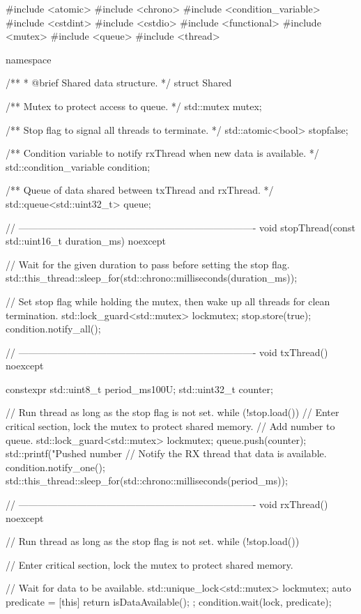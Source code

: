 \begin{cppcode}
#include <atomic>
#include <chrono>
#include <condition_variable>
#include <cstdint>
#include <cstdio>
#include <functional>
#include <mutex>
#include <queue>
#include <thread>

namespace
{
/**
 * @brief Shared data structure.
 */
struct Shared
{
    /** Mutex to protect access to queue. */
    std::mutex mutex{};

    /** Stop flag to signal all threads to terminate. */
    std::atomic<bool> stop{false};

    /** Condition variable to notify rxThread when new data is available. */
    std::condition_variable condition{};

    /** Queue of data shared between txThread and rxThread. */
    std::queue<std::uint32_t> queue{};

    // -------------------------------------------------------------------------
    void stopThread(const std::uint16_t duration_ms) noexcept
    {
        // Wait for the given duration to pass before setting the stop flag.
        std::this_thread::sleep_for(std::chrono::milliseconds(duration_ms));

        // Set stop flag while holding the mutex, then wake up all threads for clean termination.
        {
            std::lock_guard<std::mutex> lock{mutex};
            stop.store(true);
        }
        condition.notify_all();
    }

    // -------------------------------------------------------------------------
    void txThread() noexcept
    {
        constexpr std::uint8_t period_ms{100U};
        std::uint32_t counter{};

        // Run thread as long as the stop flag is not set.
        while (!stop.load())
        {
            // Enter critical section, lock the mutex to protect shared memory.
            {
                // Add number to queue.
                std::lock_guard<std::mutex> lock{mutex};
                queue.push(counter);
                std::printf("Pushed number %
            }
            // Notify the RX thread that data is available.
            condition.notify_one();
            std::this_thread::sleep_for(std::chrono::milliseconds(period_ms));
        }
    }

    // -------------------------------------------------------------------------
    void rxThread() noexcept
    {
        // Run thread as long as the stop flag is not set.
        while (!stop.load())
        {
            // Enter critical section, lock the mutex to protect shared memory.
            {
                // Wait for data to be available.
                std::unique_lock<std::mutex> lock{mutex};
                auto predicate = [this] { return isDataAvailable(); };
                condition.wait(lock, predicate);

}}}}}
\end{cppcode}
